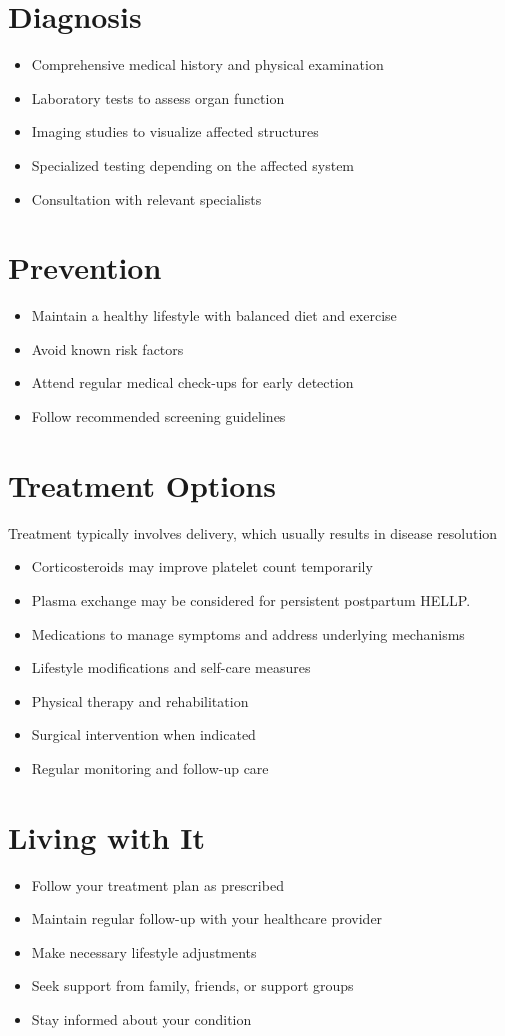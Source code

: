 \section{Diagnosis}
\begin{itemize}[noitemsep]
  \item Comprehensive medical history and physical examination
  \item Laboratory tests to assess organ function
  \item Imaging studies to visualize affected structures
  \item Specialized testing depending on the affected system
  \item Consultation with relevant specialists
\end{itemize}
\section{Prevention}
\begin{itemize}[noitemsep]
  \item Maintain a healthy lifestyle with balanced diet and exercise
  \item Avoid known risk factors
  \item Attend regular medical check-ups for early detection
  \item Follow recommended screening guidelines
\end{itemize}
\section{Treatment Options}
Treatment typically involves delivery, which usually results in disease resolution

\begin{itemize}[noitemsep]
  \item Corticosteroids may improve platelet count temporarily
  \item Plasma exchange may be considered for persistent postpartum HELLP.
  \item Medications to manage symptoms and address underlying mechanisms
  \item Lifestyle modifications and self-care measures
  \item Physical therapy and rehabilitation
  \item Surgical intervention when indicated
  \item Regular monitoring and follow-up care
\end{itemize}
\section{Living with It}
\begin{itemize}[noitemsep]
  \item Follow your treatment plan as prescribed
  \item Maintain regular follow-up with your healthcare provider
  \item Make necessary lifestyle adjustments
  \item Seek support from family, friends, or support groups
  \item Stay informed about your condition
\end{itemize}
